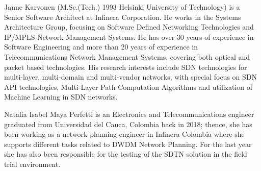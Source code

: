 \documentclass[a4paper,fleqn]{cas-dc}
\begin{document}
Janne Karvonen (M.Sc.(Tech.) 1993 Helsinki University of Technology) is a Senior Software Architect at Infinera Corporation. He works in the Systems Architecture Group, focusing on Software Defined Networking Technologies and IP/MPLS Network Management Systems. He has over 30 years of experience in Software Engineering and more than 20 years of experience in Telecommunications Network Management Systems, covering both optical and packet based technologies. His research interests include SDN technologies for multi-layer, multi-domain and multi-vendor networks, with special focus on SDN API technologies, Multi-Layer Path Computation Algorithms and utilization of Machine Learning in SDN networks.
\endbio

Natalia Isabel Maya Perfetti is an Electronics and Telecommunications engineer graduated from Universidad del Cauca, Colombia back in 2018; thence, she has been working as a network planning engineer in Infinera Colombia where she supports different tasks related to DWDM Network Planning. For the last year she has also been responsible for the testing of the SDTN solution in the field trial environment.
\endbio
\end{document}
